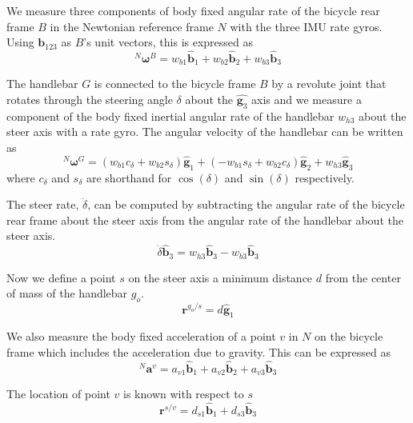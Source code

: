 \documentclass[10pt]{article}
\begin{document}
We measure three components of body fixed angular rate of the bicycle rear
frame $B$ in the Newtonian reference frame $N$ with the three IMU rate gyros.
Using $\mathbf{b}_{123}$ as $B$'s unit vectors, this is expressed as
%
\begin{equation}
  ^N\boldsymbol{\omega}^B = w_{b1}\hat{\mathbf{b}}_1 +
                            w_{b2}\hat{\mathbf{b}}_2 +
                            w_{b3}\hat{\mathbf{b}}_3
  \label{eq:rear-frame-angular-rate}
\end{equation}

The handlebar $G$ is connected to the bicycle frame $B$ by a revolute joint
that rotates through the steering angle $\delta$ about the $\hat{\mathbf{g}_3}$
axis and we measure a component of the body fixed inertial angular rate of the
handlebar $w_{h3}$ about the steer axis with a rate gyro. The angular velocity
of the handlebar can be written as
%
\begin{equation}
  ^N\boldsymbol{\omega}^G =
    (w_{b1}c_\delta + w_{b2}s_\delta)\hat{\mathbf{g}}_1 +
    (-w_{b1}s_\delta + w_{b2}c_\delta)\hat{\mathbf{g}}_2 +
    w_{h3}\hat{\mathbf{g}}_3
\end{equation}
%
where $c_\delta$ and $s_\delta$ are shorthand for $\operatorname{cos}(\delta)$
and $\operatorname{sin}(\delta)$ respectively.

The steer rate, $\dot{\delta}$, can be computed by subtracting the angular rate
of the bicycle rear frame about the steer axis from the angular rate of the
handlebar about the steer axis.
%
\begin{equation}
  \dot{\delta} \hat{\mathbf{b}}_3 = w_{h3} \hat{\mathbf{b}}_3 - w_{b3} \hat{\mathbf{b}}_3
\end{equation}

Now we define a point $s$ on the steer axis a minimum distance $d$ from the
center of mass of the handlebar $g_o$.
%
\begin{equation}
  \mathbf{r}^{g_o/s} = d\hat{\mathbf{g}}_1
\end{equation}

We also measure the body fixed acceleration of a point $v$ in $N$ on the
bicycle frame which includes the acceleration due to gravity. This can be
expressed as
%
\begin{equation}
  ^N\mathbf{a}^v =
    a_{v1}\hat{\mathbf{b}}_1 +
    a_{v2}\hat{\mathbf{b}}_2 +
    a_{v3}\hat{\mathbf{b}}_3
  \label{eq:acceleration-of-v}
\end{equation}

The location of point $v$ is known with respect to $s$
%
\begin{equation}
  \mathbf{r}^{s/v} = d_{s1}\hat{\mathbf{b}}_1 + d_{s3}\hat{\mathbf{b}}_3
\end{equation}
\end{document}
